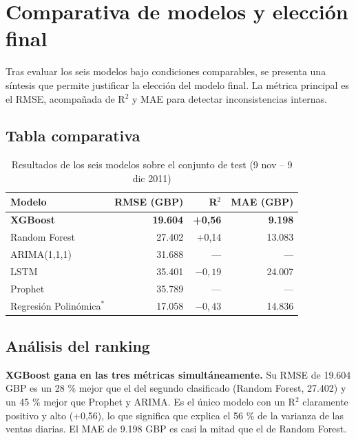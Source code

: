 \documentclass[11pt,a4paper]{article}
\begin{document}
\section{Comparativa de modelos y elección final}

Tras evaluar los seis modelos bajo condiciones comparables, se presenta una síntesis que permite justificar la elección del modelo final. La métrica principal es el RMSE, acompañada de R$^2$ y MAE para detectar inconsistencias internas.

\subsection{Tabla comparativa}

\begin{table}[h]
\centering
\caption{Resultados de los seis modelos sobre el conjunto de test (9 nov -- 9 dic 2011)}
\begin{tabular}{lrrr}
\toprule
\textbf{Modelo} & \textbf{RMSE (GBP)} & \textbf{R$^2$} & \textbf{MAE (GBP)} \\
\midrule
\textbf{XGBoost} & \textbf{19.604} & \textbf{+0,56} & \textbf{9.198} \\
Random Forest & 27.402 & +0,14 & 13.083 \\
ARIMA(1,1,1) & 31.688 & --- & --- \\
LSTM & 35.401 & $-0,19$ & 24.007 \\
Prophet & 35.789 & --- & --- \\
Regresión Polinómica$^{*}$ & 17.058 & $-0,43$ & 14.836 \\
\bottomrule
\end{tabular}
\end{table}


\subsection{Análisis del ranking}

\textbf{XGBoost gana en las tres métricas simultáneamente.} Su RMSE de 19.604 GBP es un 28 \% mejor que el del segundo clasificado (Random Forest, 27.402) y un 45 \% mejor que Prophet y ARIMA. Es el único modelo con un R$^2$ claramente positivo y alto (+0,56), lo que significa que explica el 56 \% de la varianza de las ventas diarias. El MAE de 9.198 GBP es casi la mitad que el de Random Forest.
\end{document}
